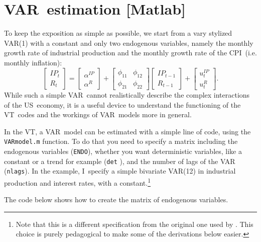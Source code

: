 \documentclass[10pt]{article}
\begin{document}
\section{VAR\ estimation {\color{note} {\protect\small {[Matlab]}}}}

To keep the exposition as simple as possible, we start from a vary stylized
VAR(1) with a constant and only two endogenous variables, namely the monthly
growth rate of industrial production and the monthly growth rate of the CPI\
(i.e. monthly inflation):%
\begin{equation*}
\begin{bmatrix}
IP_{t} \\ 
R_{t}%
\end{bmatrix}%
=%
\begin{bmatrix}
\alpha ^{IP} \\ 
\alpha ^{R}%
\end{bmatrix}%
+\left[ 
\begin{array}{cc}
\phi _{11} & \phi _{12} \\ 
\phi _{21} & \phi _{22}%
\end{array}%
\right] 
\begin{bmatrix}
IP_{t-1} \\ 
R_{t-1}%
\end{bmatrix}%
+%
\begin{bmatrix}
u_{t}^{IP} \\ 
u_{t}^{R}%
\end{bmatrix}%
.
\end{equation*}%
While such a simple VAR\ cannot realistically describe the complex
interactions of the US\ economy, it is a useful device to understand the
functioning of the VT\ codes and the workings of VAR\ models more in general.

In the VT, a VAR\ model can be estimated with a simple line of code, using
the \texttt{VARmodel.m} function. To do that you need to specify a matrix
including the endogenous variables (\texttt{ENDO}), whether you want
deterministic variables, like a constant or a trend for example (\texttt{det}%
), and the number of lags of the VAR (\texttt{nlags}). In the example, I\
specify a simple bivariate VAR(12) in industrial production and interest
rates, with a constant.\footnote{%
Note that this is a different specification from the original one used by 
\cite{GertlerKaradi2015}. This choice is purely pedagogical to make some of
the derivations below easier.}

The code below shows how to create the matrix of endogenous variables.
\end{document}
